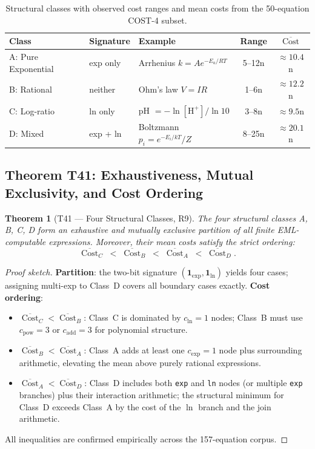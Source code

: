 \documentclass[12pt,a4paper]{article}
\newtheorem{theorem}{Theorem}[section]
\theoremstyle{definition}
\newcommand{\Cost}{\operatorname{Cost}}
\begin{document}
\begin{table}[h]
\centering
\caption{Structural classes with observed cost ranges and mean costs from the
         50-equation COST-4 subset.}
\label{tab:classes}
\smallskip
\begin{tabular}{@{}lllcc@{}}
\toprule
\textbf{Class} & \textbf{Signature} &
  \textbf{Example} & \textbf{Range} & $\overline{\Cost}$ \\
\midrule
A: Pure Exponential & exp only
  & Arrhenius $k=Ae^{-E_a/RT}$ & 5--12n & $\approx 10.4$n \\[3pt]
B: Rational         & neither
  & Ohm's law $V=IR$ & 1--6n & $\approx 12.2$n \\[3pt]
C: Log-ratio        & ln only
  & pH $=-\ln[\mathrm{H}^+]/\ln 10$ & 3--8n & $\approx 9.5$n \\[3pt]
D: Mixed            & exp + ln
  & Boltzmann $p_i=e^{-E_i/kT}/Z$ & 8--25n & $\approx 20.1$n \\
\bottomrule
\end{tabular}
\end{table}

\subsection{Theorem T41: Exhaustiveness, Mutual Exclusivity, and Cost Ordering}

\begin{theorem}[T41 --- Four Structural Classes, R9]
\label{thm:T41}
The four structural classes A, B, C, D form an \emph{exhaustive} and
\emph{mutually exclusive} partition of all finite EML-computable expressions.
Moreover, their mean costs satisfy the strict ordering:
\[
  \overline{\Cost}_C \;<\; \overline{\Cost}_B
  \;<\; \overline{\Cost}_A \;<\; \overline{\Cost}_D.
\]
\end{theorem}

\begin{proof}[Proof sketch]
\textbf{Partition}: the two-bit signature $(\mathbf{1}_{\mathrm{exp}},
\mathbf{1}_{\mathrm{ln}})$ yields four cases; assigning multi-exp to
Class~D covers all boundary cases exactly.
\textbf{Cost ordering}:
\begin{itemize}
  \item $\overline{\Cost}_C < \overline{\Cost}_B$:
        Class~C is dominated by $c_{\ln}=1$ nodes; Class~B must use
        $c_{\mathrm{pow}}=3$ or $c_{\mathrm{add}}=3$ for polynomial structure.
  \item $\overline{\Cost}_B < \overline{\Cost}_A$:
        Class~A adds at least one $c_{\exp}=1$ node plus surrounding
        arithmetic, elevating the mean above purely rational expressions.
  \item $\overline{\Cost}_A < \overline{\Cost}_D$:
        Class~D includes both \texttt{exp} and \texttt{ln} nodes (or multiple
        \texttt{exp} branches) plus their interaction arithmetic; the
        structural minimum for Class~D exceeds Class~A by the cost of the
        $\ln$ branch and the join arithmetic.
\end{itemize}
All inequalities are confirmed empirically across the 157-equation corpus.
\end{proof}
\end{document}
